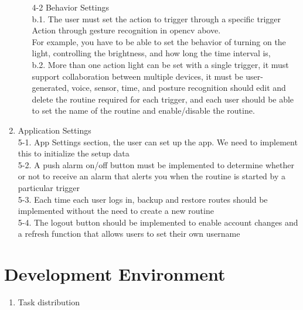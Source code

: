 \documentclass[11pt, conference]{IEEEtran}
\begin{document}
\begin{enumerate}[label=\arabic*]
\begin{enumerate}[label=\alph*]
        \item [4-2]{\large{Behavior Settings}}\\

        
        b.1. The user must set the action to trigger through a specific trigger Action through gesture recognition in opencv above. \\
        
        For example, you have to be able to set the behavior of turning on the light, controlling the brightness, and how long the time interval is,\\

        b.2. More than one action light can be set with a single trigger, it must support collaboration between multiple devices, it must be user-generated,
        voice, sensor, time, and posture recognition should edit and delete the routine required for each trigger, and each user should be able to set the name of the routine and enable/disable the routine.\\
    \end{enumerate}

    \item {\large{Application Settings}}\\


    5-1. App Settings section, the user can set up the app. We need to implement this to initialize the setup data\\


    5-2. A push alarm on/off button must be implemented to determine whether or not to receive an alarm that alerts you when the routine is started by a particular trigger\\


    5-3. Each time each user logs in, backup and restore routes should be implemented without the need to create a new routine\\


    5-4. The logout button should be implemented to enable account changes and a refresh function that allows users to set their own username
    
\end{enumerate}

\section{\Large{Development Environment}}
\begin{enumerate}[label=\arabic*]
    \item {\large{Task distribution}}
   
\end{enumerate}
\end{document}
